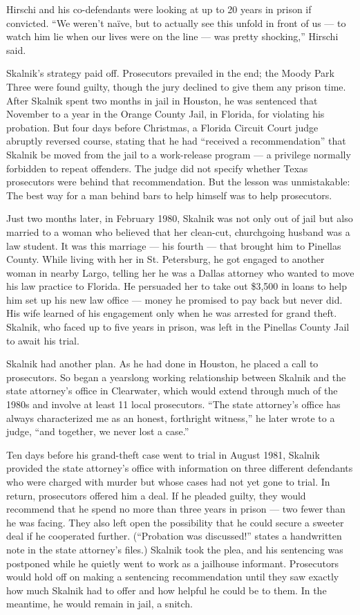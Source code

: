 Hirschi and his co-defendants were looking at up to 20 years in prison
if convicted. ``We weren't naïve, but to actually see this unfold in
front of us --- to watch him lie when our lives were on the line --- was
pretty shocking,'' Hirschi said.

Skalnik's strategy paid off. Prosecutors prevailed in the end; the Moody
Park Three were found guilty, though the jury declined to give them any
prison time. After Skalnik spent two months in jail in Houston, he was
sentenced that November to a year in the Orange County Jail, in Florida,
for violating his probation. But four days before Christmas, a Florida
Circuit Court judge abruptly reversed course, stating that he had
``received a recommendation'' that Skalnik be moved from the jail to a
work-release program --- a privilege normally forbidden to repeat
offenders. The judge did not specify whether Texas prosecutors were
behind that recommendation. But the lesson was unmistakable: The best
way for a man behind bars to help himself was to help prosecutors.

Just two months later, in February 1980, Skalnik was not only out of
jail but also married to a woman who believed that her clean-cut,
churchgoing husband was a law student. It was this marriage --- his
fourth --- that brought him to Pinellas County. While living with her in
St. Petersburg, he got engaged to another woman in nearby Largo, telling
her he was a Dallas attorney who wanted to move his law practice to
Florida. He persuaded her to take out \$3,500 in loans to help him set
up his new law office --- money he promised to pay back but never did.
His wife learned of his engagement only when he was arrested for grand
theft. Skalnik, who faced up to five years in prison, was left in the
Pinellas County Jail to await his trial.

Skalnik had another plan. As he had done in Houston, he placed a call to
prosecutors. So began a yearslong working relationship between Skalnik
and the state attorney's office in Clearwater, which would extend
through much of the 1980s and involve at least 11 local prosecutors.
``The state attorney's office has always characterized me as an honest,
forthright witness,'' he later wrote to a judge, ``and together, we
never lost a case.''

Ten days before his grand-theft case went to trial in August 1981,
Skalnik provided the state attorney's office with information on three
different defendants who were charged with murder but whose cases had
not yet gone to trial. In return, prosecutors offered him a deal. If he
pleaded guilty, they would recommend that he spend no more than three
years in prison --- two fewer than he was facing. They also left open
the possibility that he could secure a sweeter deal if he cooperated
further. (``Probation was discussed!'' states a handwritten note in the
state attorney's files.) Skalnik took the plea, and his sentencing was
postponed while he quietly went to work as a jailhouse informant.
Prosecutors would hold off on making a sentencing recommendation until
they saw exactly how much Skalnik had to offer and how helpful he could
be to them. In the meantime, he would remain in jail, a snitch.

